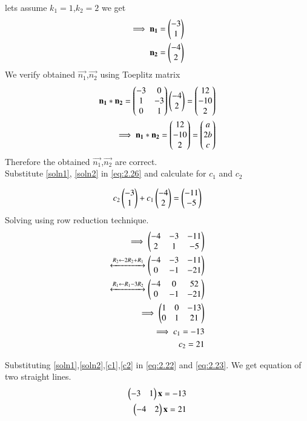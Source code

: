 \documentclass[journal,12pt,twocolumn]{IEEEtran}
\begin{document}
lets assume $k_1=1$,$k_2=2$ we get
\begin{align}
    \implies\mathbf{n_1}=\begin{pmatrix}-3\\1\end{pmatrix}\label{soln1}\\
    \mathbf{n_2}=\begin{pmatrix}-4\\2\end{pmatrix}\label{soln2}
\end{align}
We verify obtained $\vec{n_1}$,$\vec{n_2}$ using Toeplitz matrix
\begin{align}
    \mathbf{n_1}*\mathbf{n_2}=\begin{pmatrix}-3 & 0\\1 & -3\\0 & 1\end{pmatrix}\begin{pmatrix}-4 \\ 2\end{pmatrix}=\begin{pmatrix}12\\-10\\2\end{pmatrix}\label{eq:comp1}\\
    \implies \mathbf{n_1}*\mathbf{n_2}=\begin{pmatrix}12\\-10\\2\end{pmatrix}=\begin{pmatrix}a\\2b\\c\end{pmatrix}
\end{align}
Therefore the obtained $\vec{n_1}$,$\vec{n_2}$ are correct.\\
Substitute \eqref{soln1}, \eqref{soln2} in \eqref{eq:2.26}
and calculate for $c_1$ and $c_2$

\begin{align}
    c_2\begin{pmatrix}-3\\1\end{pmatrix}+c_1\begin{pmatrix}-4\\2\end{pmatrix}=\begin{pmatrix} -11\\ -5\end{pmatrix}
\end{align}
Solving using row reduction technique.
\begin{align}
    \implies\begin{pmatrix}-4 & -3 & -11\\2 & 1 & -5\end{pmatrix}\\
    \xleftrightarrow[]{R_2\leftarrow 2R_2+R_1}\begin{pmatrix}-4 & -3 & -11\\0 & -1 & -21\end{pmatrix}\\
    \xleftrightarrow[]{R_1\leftarrow R_1-3R_2}\begin{pmatrix}-4 & 0 & 52\\0 & -1 & -21\end{pmatrix}\\
    \implies\begin{pmatrix}1 & 0 & -13\\0 & 1 & 21\end{pmatrix}\\
    \implies c_1=-13\label{c1}\\
    c_2=21\label{c2}
\end{align}

Substituting \eqref{soln1},\eqref{soln2},\eqref{c1},\eqref{c2} in \eqref{eq:2.22} and \eqref{eq:2.23}. We get equation of two straight lines.
\begin{align}
    \begin{pmatrix}-3 & 1\end{pmatrix}\mathbf{x}=-13\\
    \begin{pmatrix}-4 & 2\end{pmatrix}\mathbf{x}=21
\end{align}
\end{document}

